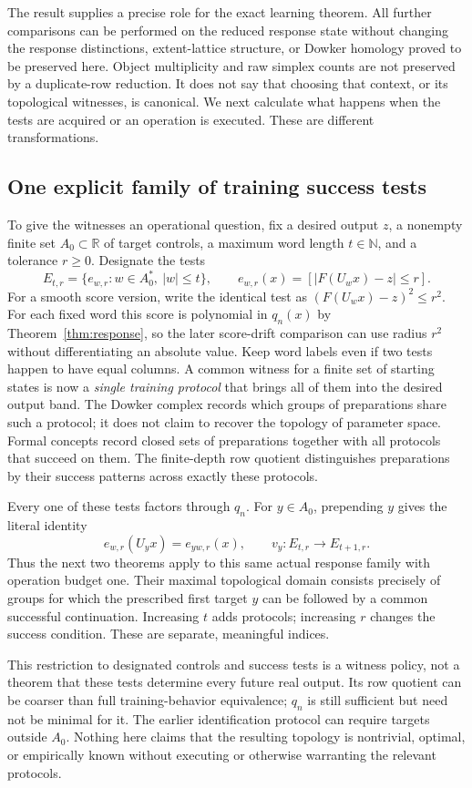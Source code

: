 \documentclass[11pt]{article}
\theoremstyle{definition}\newtheorem{definition}[theorem]{Definition}
\theoremstyle{remark}\newtheorem{remark}[theorem]{Remark}
\newcommand{\R}{\mathbb R}
\begin{document}
The result supplies a precise role for the exact learning theorem. All
further comparisons can be performed on the reduced response state without
changing the response distinctions, extent-lattice structure, or Dowker
homology proved to be preserved here. Object multiplicity and raw simplex
counts are not preserved by a duplicate-row reduction. It does not
say that choosing that context, or its topological witnesses, is canonical.
We next calculate what happens when the tests are acquired or an operation
is executed. These are different transformations.

\subsection{One explicit family of training success tests}
To give the witnesses an operational question, fix a desired output $z$,
a nonempty finite set $A_0\subset\R$ of target controls, a maximum word
length $t\in\mathbb N$, and a tolerance $r\geq0$. Designate the tests
\[
 E_{t,r}=\{e_{w,r}:w\in A_0^*,\ |w|\leq t\},\qquad
 e_{w,r}(x)=[|F(U_wx)-z|\leq r].
\]
For a smooth score version, write the identical test as
$(F(U_wx)-z)^2\leq r^2$. For each fixed word this score is polynomial
in $q_n(x)$ by Theorem~\ref{thm:response}, so the later score-drift
comparison can use radius $r^2$ without differentiating an absolute value.
Keep word labels even if two tests happen to have equal columns. A common
witness for a finite set of starting states is now a \emph{single training
protocol} that brings all of them into the desired output band. The Dowker
complex records which groups of preparations share such a protocol; it does
not claim to recover the topology of parameter space. Formal concepts record
closed sets of preparations together with all protocols that succeed on them.
The finite-depth row quotient distinguishes preparations by their success
patterns across exactly these protocols.

Every one of these tests factors through $q_n$. For $y\in A_0$, prepending
$y$ gives the literal identity
\[
 e_{w,r}(U_yx)=e_{yw,r}(x),
 \qquad v_y:E_{t,r}\to E_{t+1,r}.
\]
Thus the next two theorems apply to this same actual response family with
operation budget one. Their maximal topological domain consists precisely
of groups for which the prescribed first target $y$ can be followed by a
common successful continuation. Increasing $t$ adds protocols; increasing
$r$ changes the success condition. These are separate, meaningful indices.

This restriction to designated controls and success tests is a witness
policy, not a theorem that these tests determine every future real output.
Its row quotient can be coarser than full training-behavior equivalence;
$q_n$ is still sufficient but need not be minimal for it. The earlier
identification protocol can require targets outside $A_0$. Nothing here
claims that the resulting topology is nontrivial, optimal, or empirically
known without executing or otherwise warranting the relevant protocols.
\end{document}
